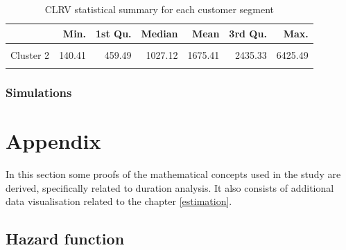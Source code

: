 \documentclass[
]{book}
\begin{document}
\begin{table}[H]

\caption{\label{tab:custValuesclust}CLRV statistical summary for each customer segment}
\centering
\begin{tabular}[t]{lrrrrrr}
\toprule
  & Min. & 1st Qu. & Median & Mean & 3rd Qu. & Max.\\
\midrule
\cellcolor{gray!6}{Cluster 1} & \cellcolor{gray!6}{141.10} & \cellcolor{gray!6}{653.93} & \cellcolor{gray!6}{930.95} & \cellcolor{gray!6}{969.20} & \cellcolor{gray!6}{1138.39} & \cellcolor{gray!6}{4727.19}\\
Cluster 2 & 140.41 & 459.49 & 1027.12 & 1675.41 & 2435.33 & 6425.49\\
\cellcolor{gray!6}{Cluster 3} & \cellcolor{gray!6}{384.60} & \cellcolor{gray!6}{2876.69} & \cellcolor{gray!6}{4312.25} & \cellcolor{gray!6}{4165.81} & \cellcolor{gray!6}{5576.70} & \cellcolor{gray!6}{6825.71}\\
\bottomrule
\end{tabular}
\end{table}

\hypertarget{simulations}{%
\subsection{Simulations}\label{simulations}}

\hypertarget{appendix}{%
\chapter*{Appendix}\label{appendix}}

In this section some proofs of the mathematical concepts used in the study are derived, specifically related to duration analysis. It also consists of additional data visualisation related to the chapter \ref{estimation}.

\hypertarget{hazard-function}{%
\section*{Hazard function}\label{hazard-function}}
\end{document}
